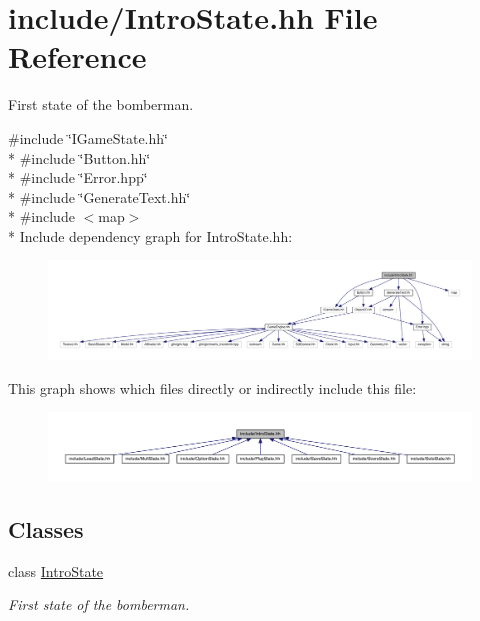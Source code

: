 \hypertarget{_intro_state_8hh}{}\section{include/\+Intro\+State.hh File Reference}
\label{_intro_state_8hh}


First state of the bomberman.  


{\ttfamily \#include \char`\"{}I\+Game\+State.\+hh\char`\"{}}\\*
{\ttfamily \#include \char`\"{}Button.\+hh\char`\"{}}\\*
{\ttfamily \#include \char`\"{}Error.\+hpp\char`\"{}}\\*
{\ttfamily \#include \char`\"{}Generate\+Text.\+hh\char`\"{}}\\*
{\ttfamily \#include $<$map$>$}\\*
Include dependency graph for Intro\+State.\+hh\+:\nopagebreak
\begin{figure}[H]
\begin{center}
\leavevmode
\includegraphics[width=350pt]{_intro_state_8hh__incl}
\end{center}
\end{figure}
This graph shows which files directly or indirectly include this file\+:\nopagebreak
\begin{figure}[H]
\begin{center}
\leavevmode
\includegraphics[width=350pt]{_intro_state_8hh__dep__incl}
\end{center}
\end{figure}
\subsection*{Classes}
\begin{DoxyCompactItemize}
\item 
class \hyperlink{class_intro_state}{Intro\+State}
\begin{DoxyCompactList}\small\item\em First state of the bomberman. \end{DoxyCompactList}\end{DoxyCompactItemize}
